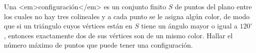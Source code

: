 Una <em>configuración</em> es un conjunto finito $S$ de puntos del plano entre los cuales no hay tres colineales y a cada punto se le asigna algún color, de modo que si un triángulo cuyos vértices están en $S$ tiene un ángulo mayor o igual a $120^{\circ}$, entonces exactamente dos de sus vértices son de un mismo color. \newline 
Hallar el número máximo de puntos que puede tener una configuración.
